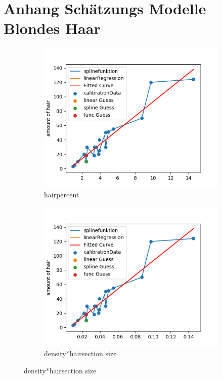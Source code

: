 \documentclass[german,a4paper, 12pt]{scrartcl}
\begin{document}
\section{Anhang Schätzungs Modelle Blondes Haar}
\label{appendix:Blond}
\begin{figure}[H] %
	\begin{subfigure}{0.48\textwidth}
		\includegraphics[width=1.1\linewidth]{figBina/g1.png}
		\caption{hairpercent} \label{fig:a}
	\end{subfigure}\hspace*{\fill}
	\begin{subfigure}{0.48\textwidth}
		\includegraphics[width=1.1\linewidth]{figBina/g2.png}
		\caption{density*hairsection size} \label{fig:b}
	\end{subfigure}
	

\end{figure}
\end{document}
